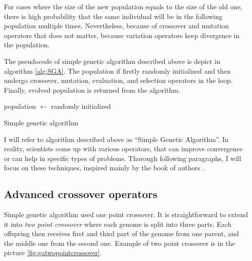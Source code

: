 For cases where the size of the new population equals to the size of the old one, there is high probability that the same individual will be in the following population multiple times. Nevertheless, because of crossover and mutation operators that does not matter, because variation operators keep divergence in the population.

The pseudocode of simple genetic algorithm described above is depict in algorithm \ref{alg:SGA}. The population if firstly randomly initialized and then undergo crossover, mutation, evaluation, and selection operators in the loop. Finally, evolved population is returned from the algorithm.

\begin{algorithm}
    population $\leftarrow$ randomly initialized\;
    \caption{Simple genetic algorithm}
    \label{alg:SGA}
\end{algorithm}

I will refer to algorithm described above as \enquote{Simple Genetic Algorithm}. In reality, scientists come up with various operators, that can improve convergence or can help in specific types of problems. Thorough following paragraphs, I will focus on these techniques, inspired mainly by the book of authors \citet*{IntroToGA}.

\subsection{Advanced crossover operators}

Simple genetic algorithm used one point crossover. It is straightforward to extend it into \emph{two point crossover} where each genome is split into three parts. Each offspring then receives first and third part of the genome from one parent, and the middle one from the second one. Example of two point crossover is in the picture \ref{fig:gatwopointcrossover}.

